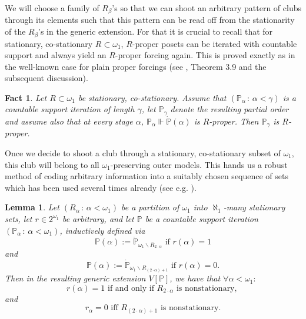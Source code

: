 \documentclass[a4paper,12pt]{article}
\newtheorem{lemma}[theorem]{Lemma}
\newtheorem{fact}[theorem]{Fact}
\newcommand{\forceP}{\mathbb{P}}
\begin{document}
We will choose a family of $R_{\beta}$'s so that we can shoot an arbitrary pattern of clubs through its elements such that this pattern can be read off
from the stationarity of the $R_{\beta}$'s in the generic extension.
For that it is crucial to recall that for stationary, co-stationary  $R \subset \omega_1$, $R$-proper posets can be iterated with countable support and always yield an $R$-proper forcing again. This is proved exactly as in the well-known case for plain proper forcings (see \cite{Goldstern}, Theorem 3.9 and the subsequent discussion).
\begin{fact}
Let $R \subset \omega_1$ be stationary, co-stationary. Assume that $(\forceP_{\alpha} \, : \, \alpha< \gamma)$ is a countable support iteration of length $\gamma$, let $\forceP_{\gamma}$ denote the resulting partial order and assume also that at every stage $\alpha$, $\forceP_{\alpha} \Vdash  \dot{\forceP}({\alpha})$ is $R$-proper. Then $\forceP_{\gamma}$ is $R$-proper.
\end{fact}


Once we decide to shoot a club through a stationary, co-stationary subset of $\omega_1$, this club will belong to all $\omega_1$-preserving outer models. This hands us a robust method of coding arbitrary information into a suitably chosen sequence of sets
which has been used several times already (see e.g. \cite{SyVera}).
\begin{lemma}\label{coding with stationary sets}
 Let $(R_{ \alpha} \, : \, \alpha < \omega_1)$ be a partition of $\omega_1$ into $\aleph_1$-many stationary sets, let  $r \in 2^{\omega_1}$ be arbitrary, and let $\forceP$ be a countable support iteration $(\forceP_{\alpha} \, : \, \alpha < \omega_1)$, inductively defined via \[\forceP(\alpha) := \dot{\forceP}_{\omega_1 \backslash R_{2 \cdot \alpha}} \text{ if } r(\alpha)=1 \] and
 \[\forceP({\alpha}) := \dot{\forceP}_{\omega_1 \backslash R_{(2 \cdot\alpha) +1}} \text{ if } r(\alpha)=0.\]
 Then in the resulting generic extension $V[\forceP]$, we have that $\forall \alpha < \omega_1:$ \[ r(\alpha)=1 \text{ if and only if }
 R_{2 \cdot \alpha} \text{  is nonstationary, }\]  and \[ r_{\alpha}=0 \text{ iff } R_{(2 \cdot \alpha)+1} \text{ is nonstationary.} \]
\end{lemma}
\end{document}
